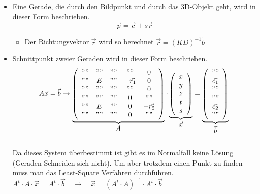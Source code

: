 \begin{itemize}
			\item Eine Gerade, die durch den Bildpunkt und durch das 3D-Objekt geht, wird in dieser Form beschrieben.
				\begin{equation*}
					\vec{p} = \vec{c} + s \vec{r}
				\end{equation*}
			
				\begin{itemize}
					\item Der Richtungsvektor $\vec{r}$ wird so berechnet $\vec{r}=(KD)^{-1} \tilde{b}$
					
				\end{itemize}
		
			\item Schnittpunkt zweier Geraden wird in dieser Form beschrieben.\\
				\begin{equation*}
				A\vec{x}=\vec{b} \rightarrow
				\underbrace{\left(\begin{array}{ccccc}
					" "&" "&" "&" "& 0\\
					" "& E &" "&-\vec{r_1}&0\\
					" "&" "&" "&" "& 0\\
					" "&" "&" "& 0 & " "\\
					" "& E &" "& 0 &-\vec{r_2}\\
					" "&" "&" "& 0 & " "
					\end{array}\right)}_{\displaystyle A}\cdot
				\underbrace{\left(\begin{array}{c}
					x\\y\\z\\t\\s
					\end{array}\right)}_{\displaystyle\vec{x}} = 
				\underbrace{\left(\begin{array}{c}
					" "\\\vec{c_1}\\" "\\" "\\\vec{c_2}\\" "
					\end{array}\right)}_{\displaystyle\vec{b}}\\
				\end{equation*}\\
				Da dieses System überbestimmt ist gibt es im Normalfall keine Lösung (Geraden Schneiden sich nicht). Um aber trotzdem einen Punkt zu finden muss man das Least-Square Verfahren durchführen.\\[0.2cm]
				$A^t \cdot A \cdot \vec{x} = A^t \cdot \vec{b}
				\quad \rightarrow \quad
				\vec{x} = (A^t \cdot A)^{-1} \cdot A^t \cdot \vec{b}$
		\end{itemize}
			

